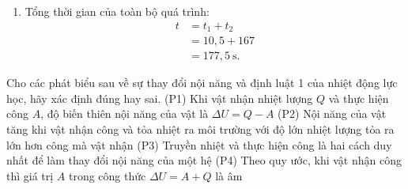 \begin{bt}
{\begin{enumerate}
			\[
			\begin{aligned}
				Q_2 &= m\lambda \\
				&= 1 \cdot 3{,}34 \cdot 10^5 \\
				&= 334\,000\ \mathrm{J}.
			\end{aligned}
			\]
			Thời gian tương ứng:
			\[
			\begin{aligned}
				t_2 &= \frac{Q_2}{\mathcal{P}} \\
				&= \frac{334\,000}{2\,000} \\
				&= 167\ \mathrm{s}.
			\end{aligned}
			\]
			\item Tổng thời gian của toàn bộ quá trình:
			\[
			\begin{aligned}
				t &= t_1 + t_2 \\
				&= 10{,}5 + 167 \\
				&= 177{,}5\ \mathrm{s}.
			\end{aligned}
			\]
		\end{enumerate}
	}
\end{bt}

\begin{ex}
Cho các phát biểu sau về sự thay đổi nội năng và định luật 1 của nhiệt động lực học, hãy xác định đúng hay sai.
\choiceTF
{\True (P1) Khi vật nhận nhiệt lượng $Q$ và thực hiện công $A$, độ biến thiên nội năng của vật là $\Delta U = Q - A$}
{(P2) Nội năng của vật tăng khi vật nhận công và tỏa nhiệt ra môi trường với độ lớn nhiệt lượng tỏa ra lớn hơn công mà vật nhận}
{\True (P3) Truyền nhiệt và thực hiện công là hai cách duy nhất để làm thay đổi nội năng của một hệ}
{(P4) Theo quy ước, khi vật nhận công thì giá trị $A$ trong công thức $\Delta U = A + Q$ là âm}
\end{ex}

